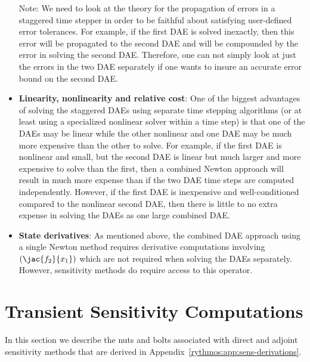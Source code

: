 \documentclass[pdf,ps2pdf,11pt]{SANDreport}
\begin{document}
\begin{itemize}
Note: We need to look at the theory for the propagation of errors in a
staggered time stepper in order to be faithful about satisfying user-defined
error tolerances.  For example, if the first DAE is solved inexactly, then
this error will be propagated to the second DAE and will be compounded by the
error in solving the second DAE.  Therefore, one can not simply look at just
the errors in the two DAE separately if one wants to insure an accurate error
bound on the second DAE.
%
{}\item {}\textbf{Linearity, nonlinearity and relative cost}: One of the
biggest advantages of solving the staggered DAEs using separate time stepping
algorithms (or at least using a specialized nonlinear solver within a time
step) is that one of the DAEs may be linear while the other nonlinear and one
DAE may be much more expensive than the other to solve.  For example, if the
first DAE is nonlinear and small, but the second DAE is linear but much larger
and more expensive to solve than the first, then a combined Newton approach
will result in much more expense than if the two DAE time steps are computed
independently.  However, if the first DAE is inexpensive and well-conditioned
compared to the nonlinear second DAE, then there is little to no extra expense
in solving the DAEs as one large combined DAE.
%
{}\item {}\textbf{State derivatives}: As mentioned above, the combined DAE
approach using a single Newton method requires derivative computations
involving $(\jac{f_2}{x_1})$ which are not required when solving the DAEs
separately.  However, sensitivity methods do require access to this operator.
%
\end{itemize}

\section{Transient Sensitivity Computations}
\label{rythmos:sec:trans-sens}

In this section we describe the nuts and bolts associated with direct and
adjoint sensitivity methods that are derived in
Appendix~\ref{rythmos:app:sens-derivations}.
\end{document}
